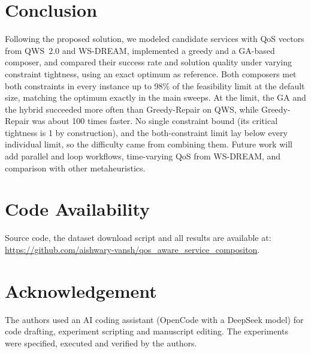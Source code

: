 \documentclass[conference]{IEEEtran}
\begin{document}
\section{Conclusion}\label{sec:conclusion}
Following the proposed solution, we modeled candidate services with QoS vectors from QWS~2.0 and WS-DREAM, implemented a greedy and a GA-based composer, and compared their success rate and solution quality under varying constraint tightness, using an exact optimum as reference. Both composers met both constraints in every instance up to 98\% of the feasibility limit at the default size, matching the optimum exactly in the main sweeps. At the limit, the GA and the hybrid succeeded more often than Greedy-Repair on QWS, while Greedy-Repair was about 100 times faster. No single constraint bound (its critical tightness is 1 by construction), and the both-constraint limit lay below every individual limit, so the difficulty came from combining them. Future work will add parallel and loop workflows, time-varying QoS from WS-DREAM, and comparison with other metaheuristics.

\FloatBarrier   %
\section*{Code Availability}
Source code, the dataset download script and all results are available at:
\url{https://github.com/aishwary-vansh/qos_aware_service_compositon}.

\section*{Acknowledgement}
The authors used an AI coding assistant (OpenCode with a DeepSeek model) for code drafting, experiment scripting and manuscript editing. The experiments were specified, executed and verified by the authors.
\end{document}
